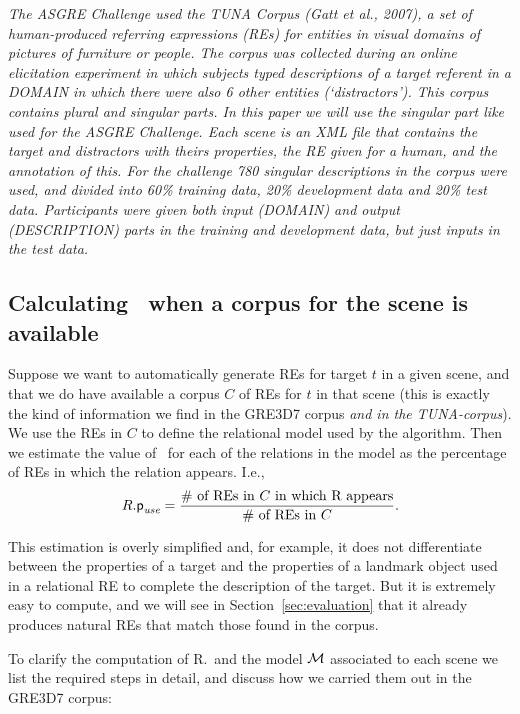 \textit{The ASGRE Challenge used the TUNA Corpus (Gatt
et al., 2007), a set of human-produced referring expressions (REs) for entities in visual domains of
pictures of furniture or people. The corpus was
collected during an online elicitation experiment in
which subjects typed descriptions of a target referent
in a DOMAIN in which there were also 6 other entities (‘distractors’). 
This corpus contains plural and singular parts. In this paper we will use the singular part like used for the ASGRE Challenge. Each scene is an XML file that contains the target and distractors with theirs properties, the RE given for a human, and the annotation of this.   
For the challenge 780 singular descriptions in the corpus were used, and divided
into 60\% training data, 20\% development data and
20\% test data. Participants were given both input
(DOMAIN) and output (DESCRIPTION) parts in the
training and development data, but just inputs in the
test data.}


\subsection{Calculating \puse\ when a corpus for the scene is available}

Suppose we want to automatically generate REs for target $t$ in a given scene, and that we do have available a corpus $C$ 
of REs for $t$ in that scene (this is exactly the kind of information we find in the GRE3D7 corpus \textit{and in the TUNA-corpus}).  
We use the REs in $C$ to define the relational model 
used by the algorithm.  Then we estimate the value of \puse\ for each of the relations in the model as the percentage of REs 
in which the relation appears.  I.e., 
\begin{equation}\label{eq1}
R.\textsf{p}_\textit{use} = \frac{\# \mbox{ of REs in $C$ in which R appears}}{\# \mbox{ of REs in $C$}}.
\end{equation}

\noindent
This estimation is overly simplified and, for example, it does not differentiate between the properties of a target and the 
properties of a landmark object used in a relational RE to complete the description of the target.  But it is extremely easy 
to compute, and we will see in Section~\ref{sec:evaluation} that it already produces natural REs that match those found in the corpus. 

To clarify the computation of R.\puse\ and the model $\mathcal{M}$ associated to each scene we list the required steps in detail, 
and discuss how we carried them out in the GRE3D7 corpus:

